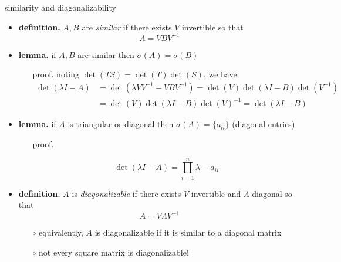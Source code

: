 \documentclass[10pt,hyperref]{beamer}
\begin{document}
\begin{frame}{similarity and diagonalizability}

\begin{itemize}
\item \textbf{definition.} $A,B$ are \emph{similar} if there exists $V$ invertible so that
    $$A = V B V^{-1}$$
\item \textbf{lemma.} if $A,B$ are similar then $\sigma(A)=\sigma(B)$
    \begin{itemize}
    \item[proof.] noting $\det(TS)=\det(T)\det(S)$, we have
\begin{align*}
\det(\lambda I - A) &= \det(\lambda VV^{-1} - V B V^{-1}) = \det(V) \det(\lambda I - B) \det(V^{-1}) \\
    &= \det(V) \det(\lambda I - B) \det(V)^{-1} = \det(\lambda I - B)
\end{align*}
    \end{itemize}
\item \textbf{lemma.} if $A$ is triangular or diagonal then $\sigma(A)=\{a_{ii}\}$  (diagonal entries)
    \begin{itemize}
    \item[proof.]

    $$\det(\lambda I - A) = \prod_{i=1}^n \lambda-a_{ii}$$
    \end{itemize}
\item \textbf{definition.} $A$ is \emph{diagonalizable} if there exists $V$ invertible and $\Lambda$ diagonal so that
    $$A = V \Lambda V^{-1}$$

    \begin{itemize}
    \item[$\circ$] equivalently, $A$ is diagonalizable if it is similar to a diagonal matrix
    \item[$\circ$] not every square matrix is diagonalizable!
    \end{itemize}
\end{itemize}
\end{frame}
\end{document}

